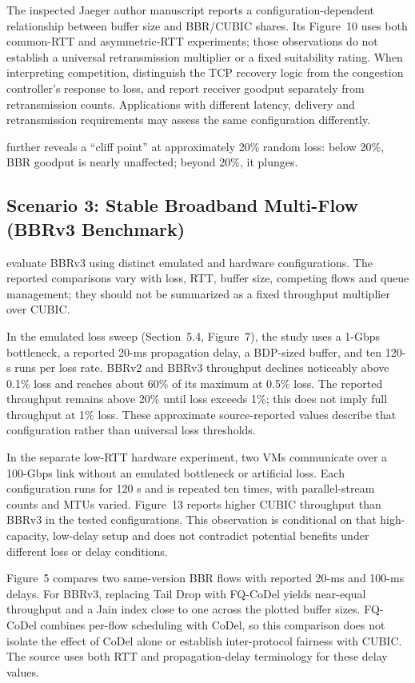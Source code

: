 \documentclass[a4paper,fleqn]{cas-sc}
\begin{document}
The inspected Jaeger author manuscript reports a configuration-dependent
relationship between buffer size and BBR/CUBIC shares. Its Figure~10 uses
both common-RTT and asymmetric-RTT experiments; those observations do
not establish a universal retransmission multiplier or a fixed suitability
rating. When interpreting competition, distinguish the TCP recovery logic
from the congestion controller's response to loss, and report receiver
goodput separately from retransmission counts. Applications with different
latency, delivery and retransmission requirements may assess the same
configuration differently.

\citet{cao2019bbr} further reveals a ``cliff point'' at approximately 20\% random
loss: below 20\%, BBR goodput is nearly unaffected; beyond 20\%, it plunges.

\FloatBarrier

\subsection{Scenario 3: Stable Broadband Multi-Flow (BBRv3 Benchmark)}
\label{sec:bbr3}

\citet{gomez2024bbrv3} evaluate BBRv3 using distinct emulated and
hardware configurations. The reported comparisons vary with loss, RTT,
buffer size, competing flows and queue management; they should not be
summarized as a fixed throughput multiplier over CUBIC.

In the emulated loss sweep (Section~5.4, Figure~7), the study uses a
1-Gbps bottleneck, a reported 20-ms propagation delay, a BDP-sized buffer,
and ten 120-s runs per loss rate. BBRv2 and BBRv3 throughput declines
noticeably above 0.1\% loss and reaches about 60\% of its maximum at
0.5\% loss. The reported throughput remains above 20\% until loss exceeds
1\%; this does not imply full throughput at 1\% loss. These approximate
source-reported values describe that configuration rather than universal
loss thresholds.

In the separate low-RTT hardware experiment, two VMs communicate over a
100-Gbps link without an emulated bottleneck or artificial loss. Each
configuration runs for 120 s and is repeated ten times, with parallel-stream
counts and MTUs varied. Figure~13 reports higher CUBIC throughput than
BBRv3 in the tested configurations. This observation is conditional on that
high-capacity, low-delay setup and does not contradict potential benefits
under different loss or delay conditions.

Figure~5 compares two same-version BBR flows with reported 20-ms and
100-ms delays. For BBRv3, replacing Tail Drop with FQ-CoDel yields
near-equal throughput and a Jain index close to one across the plotted
buffer sizes. FQ-CoDel combines per-flow scheduling with CoDel, so this
comparison does not isolate the effect of CoDel alone or establish
inter-protocol fairness with CUBIC. The source uses both RTT and
propagation-delay terminology for these delay values.
\end{document}
